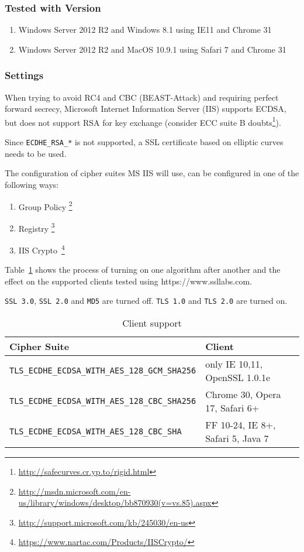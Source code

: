 
\subsubsection{Tested with Version} 

\begin{enumerate}
\item Windows Server 2012 R2 and Windows 8.1 using IE11 and Chrome 31
\item Windows Server 2012 R2 and MacOS 10.9.1 using Safari 7 and Chrome 31
\end{enumerate}

\subsubsection{Settings}


When trying to avoid RC4 and CBC (BEAST-Attack) and requiring perfect
forward secrecy, Microsoft Internet Information Server (IIS) supports
ECDSA, but does not support RSA for key exchange (consider ECC suite
B doubts\footnote{\url{http://safecurves.cr.yp.to/rigid.html}}).

Since \verb|ECDHE_RSA_*| is not supported, a SSL certificate based on
elliptic curves needs to be used.

The configuration of cipher suites MS IIS will use, can be configured in one
of the following ways:
\begin{enumerate}
\item Group Policy \footnote{\url{http://msdn.microsoft.com/en-us/library/windows/desktop/bb870930(v=vs.85).aspx}}
\item Registry \footnote{\url{http://support.microsoft.com/kb/245030/en-us}}
\item IIS Crypto~\footnote{\url{https://www.nartac.com/Products/IISCrypto/}}
\end{enumerate}


Table~\ref{tab:MS_IIS_Client_Support} shows the process of turning on
one algorithm after another and the effect on the supported clients
tested using https://www.ssllabs.com.

\verb|SSL 3.0|, \verb|SSL 2.0| and \verb|MD5| are turned off.
\verb|TLS 1.0| and \verb|TLS 2.0| are turned on.

\begin{table}[h]
  \centering
  \small
  \begin{tabular}{ll}
    \toprule
    Cipher Suite & Client \\
    \midrule
    \verb|TLS_ECDHE_ECDSA_WITH_AES_128_GCM_SHA256| & only IE 10,11, OpenSSL 1.0.1e \\
    \verb|TLS_ECDHE_ECDSA_WITH_AES_128_CBC_SHA256| & Chrome 30, Opera 17, Safari 6+ \\
    \verb|TLS_ECDHE_ECDSA_WITH_AES_128_CBC_SHA| & FF 10-24, IE 8+, Safari 5, Java 7\\
    \bottomrule 
 \end{tabular}
  \caption{Client support}
  \label{tab:MS_IIS_Client_Support}
\end{table}

